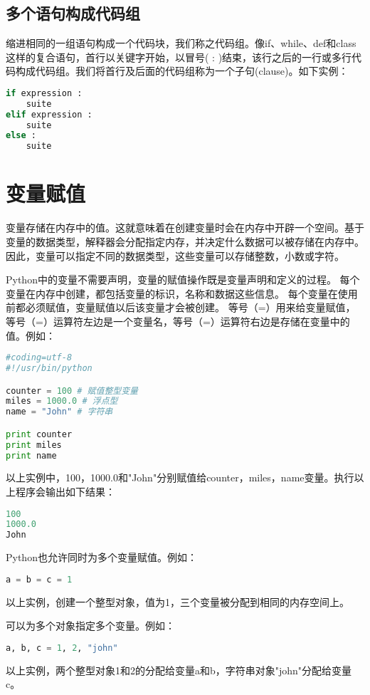 \subsection{多个语句构成代码组}
缩进相同的一组语句构成一个代码块，我们称之代码组。像if、while、def和class这样的复合语句，首行以关键字开始，以冒号( : )结束，该行之后的一行或多行代码构成代码组。我们将首行及后面的代码组称为一个子句(clause)。如下实例：
\begin{lstlisting}[language=Python]
if expression : 
    suite 
elif expression :  
    suite  
else :  
    suite 
\end{lstlisting}



\section{变量赋值}
变量存储在内存中的值。这就意味着在创建变量时会在内存中开辟一个空间。基于变量的数据类型，解释器会分配指定内存，并决定什么数据可以被存储在内存中。因此，变量可以指定不同的数据类型，这些变量可以存储整数，小数或字符。

Python中的变量不需要声明，变量的赋值操作既是变量声明和定义的过程。
每个变量在内存中创建，都包括变量的标识，名称和数据这些信息。
每个变量在使用前都必须赋值，变量赋值以后该变量才会被创建。
等号（=）用来给变量赋值，等号（=）运算符左边是一个变量名，等号（=）运算符右边是存储在变量中的值。例如：
\begin{lstlisting}[language=Python]
#coding=utf-8
#!/usr/bin/python

counter = 100 # 赋值整型变量
miles = 1000.0 # 浮点型
name = "John" # 字符串

print counter
print miles
print name
\end{lstlisting}
以上实例中，100，1000.0和"John"分别赋值给counter，miles，name变量。执行以上程序会输出如下结果：
\begin{lstlisting}[language=Python]
100
1000.0
John
\end{lstlisting}

Python也允许同时为多个变量赋值。例如：
\begin{lstlisting}[language=Python]
a = b = c = 1
\end{lstlisting}
以上实例，创建一个整型对象，值为1，三个变量被分配到相同的内存空间上。

可以为多个对象指定多个变量。例如：
\begin{lstlisting}[language=Python]
a, b, c = 1, 2, "john"
\end{lstlisting}
以上实例，两个整型对象1和2的分配给变量a和b，字符串对象"john"分配给变量c。



